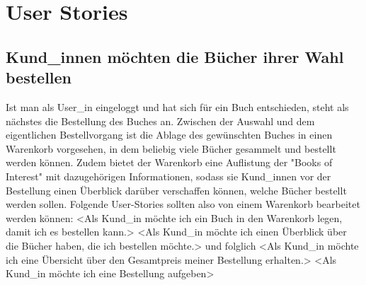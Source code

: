 \section{User Stories}

	\subsection{Kund\_innen möchten die Bücher ihrer Wahl bestellen}
	 Ist man als User\_in eingeloggt und hat sich für ein Buch entschieden, steht als nächstes die Bestellung des Buches an. Zwischen der Auswahl und dem eigentlichen Bestellvorgang ist die Ablage des gewünschten Buches in einen Warenkorb vorgesehen, in dem beliebig viele Bücher gesammelt und bestellt werden können. Zudem bietet der Warenkorb eine Auflistung der "Books of Interest" mit dazugehörigen Informationen, sodass sie Kund\_innen vor der Bestellung einen Überblick darüber verschaffen können, welche Bücher bestellt werden sollen. Folgende User-Stories sollten also von einem Warenkorb bearbeitet werden können:
	 <Als Kund\_in möchte ich ein Buch in den Warenkorb legen, damit ich es bestellen kann.>
	 <Als Kund\_in möchte ich einen Überblick über die Bücher haben, die ich bestellen möchte.>
	 und folglich <Als Kund\_in möchte ich eine Übersicht über den Gesamtpreis meiner Bestellung erhalten.>
	 <Als Kund\_in möchte ich eine Bestellung aufgeben>
